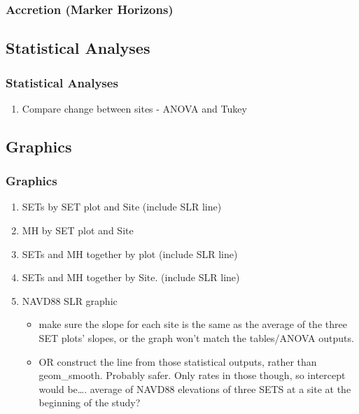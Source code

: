 \documentclass[]{article}
\providecommand{\tightlist}{%
  \setlength{\itemsep}{0pt}\setlength{\parskip}{0pt}}
\begin{document}
\subsubsection{Accretion (Marker
Horizons)}\label{accretion-marker-horizons}

\subsection{Statistical Analyses}\label{statistical-analyses}

\subsubsection{Statistical Analyses}\label{statistical-analyses-1}

\begin{enumerate}
\def\labelenumi{\arabic{enumi}.}
\tightlist
\item
  Compare change between sites - ANOVA and Tukey
\end{enumerate}

\subsection{Graphics}\label{graphics}

\subsubsection{Graphics}\label{graphics-1}

\begin{enumerate}
\def\labelenumi{\arabic{enumi}.}
\tightlist
\item
  SETs by SET plot and Site (include SLR line)
\item
  MH by SET plot and Site\\
\item
  SETs and MH together by plot (include SLR line)
\item
  SETs and MH together by Site. (include SLR line)
\item
  NAVD88 SLR graphic

  \begin{itemize}
  \tightlist
  \item
    make sure the slope for each site is the same as the average of the
    three SET plots' slopes, or the graph won't match the tables/ANOVA
    outputs.\\
  \item
    OR construct the line from those statistical outputs, rather than
    geom\_smooth. Probably safer. Only rates in those though, so
    intercept would be\ldots{}. average of NAVD88 elevations of three
    SETS at a site at the beginning of the study?
  \end{itemize}
\end{enumerate}
\end{document}
